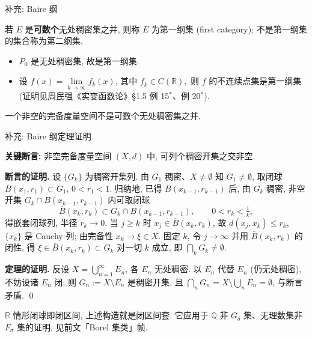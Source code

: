 
\begin{frame}{补充: Baire 纲}

\begin{Def}[第一纲集与第二纲集]
若 $E$ 是\textbf{可数个}无处稠密集之并, 则称 $E$ 为\alert{第一纲集} (first category); 不是第一纲集的集合称为\alert{第二纲集}.
\end{Def}

\pause

\begin{eg}
\begin{itemize}
\item $P_0$ 是无处稠密集, 故是第一纲集.
\item 设 $f(x) = \lim\limits_{k \to \infty} f_k(x)$, 其中 $f_k \in C(\mathbb{R}),$ 则 $f$ 的不连续点集是第一纲集
(证明见周民强《实变函数论》\S 1.5 例 15$^{*}$、例 20$^{*}$).
\end{itemize}
\end{eg}

\pause

\begin{thm}
一个非空的完备度量空间不是可数个无处稠密集之并.
\end{thm}

\end{frame}


\begin{frame}{补充: Baire 纲定理证明}

\textbf{关键断言:} 非空完备度量空间 $(X, d)$ 中, 可列个稠密开集之交非空.

\pause

\textbf{断言的证明.} 设 $\{G_k\}$ 为稠密开集列. 由 $G_1$ 稠密、$X \neq \emptyset$ 知 $G_1 \neq \emptyset$, 取闭球 $\overline{B}(x_1, r_1) \subset G_1$, $0 < r_1 < 1$. 归纳地, 已得 $\overline{B}(x_{k-1}, r_{k-1})$ 后, 由 $G_k$ 稠密, 非空开集 $G_k \cap B(x_{k-1}, r_{k-1})$ 内可取闭球
\[
  \overline{B}(x_k, r_k) \subset G_k \cap B(x_{k-1}, r_{k-1}), \qquad 0 < r_k < \tfrac{1}{k},
\]
得嵌套闭球列, 半径 $r_k \to 0$. 当 $j \geqslant k$ 时 $x_j \in \overline{B}(x_k, r_k)$, 故 $d(x_j, x_k) \leqslant r_k$, $\{x_k\}$ 是 Cauchy 列; 由完备性 $x_k \to \xi \in X$. 固定 $k$, 令 $j \to \infty$ 并用 $\overline{B}(x_k, r_k)$ 的闭性, 得 $\xi \in \overline{B}(x_k, r_k) \subset G_k$ 对一切 $k$ 成立, 即 $\bigcap_k G_k \neq \emptyset$.

\pause

\textbf{定理的证明.} 反设 $X = \bigcup_{n=1}^{\infty} E_n$, 各 $E_n$ 无处稠密. 以 $\overline{E_n}$ 代替 $E_n$ (仍无处稠密), 不妨设诸 $E_n$ 闭; 则 $G_n := X \setminus E_n$ 是稠密开集, 且 $\bigcap_n G_n = X \setminus \bigcup_n E_n = \emptyset$, 与断言矛盾. \qed

\pause

\begin{remark}
$\mathbb{R}$ 情形闭球即闭区间, 上述构造就是闭区间套. 它应用于 $\mathbb{Q}$ 非 $G_\delta$ 集、无理数集非 $F_\sigma$ 集的证明, 见前文「Borel 集类」帧.
\end{remark}

\end{frame}
\normalmode

